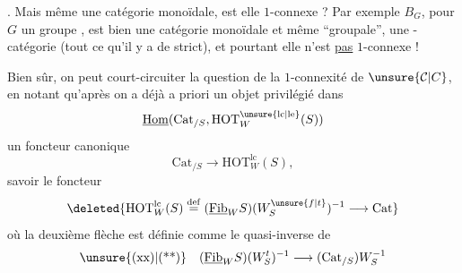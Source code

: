 
. Mais même une catégorie monoïdale, est elle $1$-connexe ? Par exemple $B_G$, pour $G$ un groupe , est bien une catégorie monoïdale et même ``groupale'', une -catégorie (tout ce qu'il y a de strict), et pourtant elle n'est \uline{pas} $1$-connexe !

Bien sûr, on peut court-circuiter la question de la $1$-connexité de $\unsure{\mathcal{C}|C}$, en notant qu'après   on a déjà a priori un objet privilégié dans
\[
\underline{\mathrm{Hom}}(\mathrm{Cat}_{/S},\mathrm{HOT}_{W}^{\unsure{\mathrm{lc}|\mathrm{le}}}(S))
\]
 un foncteur canonique
\[
\mathrm{Cat}_{/S}\longrightarrow\mathrm{HOT}_{W}^{\mathrm{lc}}(S),
\]
savoir  le foncteur  
\[
\deleted{\mathrm{HOT}^{\mathrm{lc}}_W(S)\overset{\mathrm{def}}{=}(\underline{\mathrm{Fib}}_W S)(W_S^{\unsure{f|t}})^{-1}\longrightarrow\mathrm{Cat}}
\]
où la deuxième flèche est définie comme le quasi-inverse de
\[
\text{\unsure{(xx)|(**)}}\quad(\underline{\mathrm{Fib}}_W S)(W_S^{t})^{-1}\longrightarrow(\mathrm{Cat}_{/S})W_S^{-1}
\]
